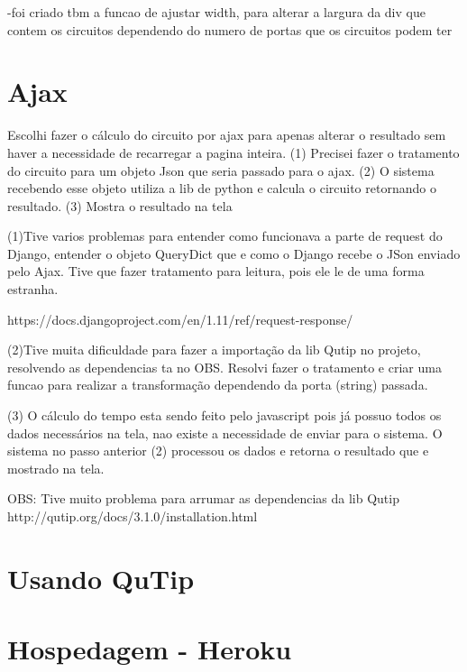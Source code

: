 \documentclass[a4paper, 12pt, oneside]{book}
\begin{document}
-foi criado tbm a funcao de ajustar width, para alterar a largura da div que contem os circuitos dependendo do numero de portas que os circuitos podem ter


\section{Ajax}

Escolhi fazer o cálculo do circuito por ajax para apenas alterar o resultado sem haver a necessidade de recarregar a pagina inteira. (1) Precisei fazer o tratamento do circuito para um objeto Json que seria passado para o ajax. (2) O sistema recebendo esse objeto utiliza a lib de python e calcula o circuito retornando o resultado. (3) Mostra o resultado na tela

(1)Tive varios problemas para entender como funcionava a parte de request do Django, entender o objeto QueryDict que e como o Django recebe o JSon enviado pelo Ajax. Tive que fazer tratamento para leitura, pois ele le de uma forma estranha.

https://docs.djangoproject.com/en/1.11/ref/request-response/

(2)Tive muita dificuldade para fazer a importação da lib Qutip no projeto, resolvendo as dependencias ta no OBS. Resolvi fazer o tratamento e criar uma funcao para realizar a transformação dependendo da porta (string) passada.

(3) O cálculo do tempo esta sendo feito pelo javascript pois já possuo todos os dados necessários na tela, nao existe a necessidade de enviar para o sistema. O sistema no passo anterior (2) processou os dados e retorna o resultado que e mostrado na tela.

OBS: Tive muito problema para arrumar as dependencias da lib Qutip
http://qutip.org/docs/3.1.0/installation.html

\section{Usando QuTip}


\section{Hospedagem - Heroku}
\end{document}
